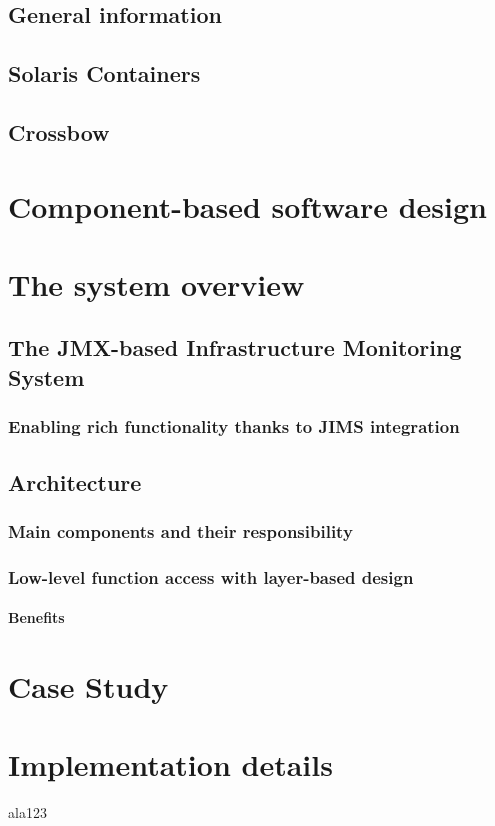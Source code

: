 \documentclass[11pt]{book}
\begin{document}
    \section{General information}


    \section{Solaris Containers}


    \section{Crossbow}


  \chapter{Component-based software design}


  \chapter{The system overview}

    \section{The JMX-based Infrastructure Monitoring System}


    \subsection{Enabling rich functionality thanks to JIMS integration}


    \section{Architecture}

      \subsection{Main components and their responsibility}


      \subsection{Low-level function access with layer-based design}

        \subsubsection{Benefits}


  \chapter{Case Study}


  \chapter{Implementation details}



  \begin{thebibliography}{some-label}

     ala123

  \end{thebibliography}
\end{document}
